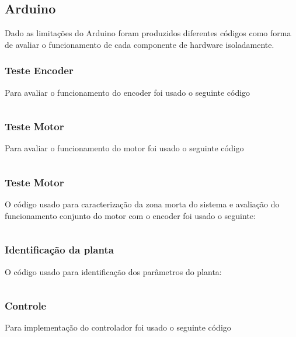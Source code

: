 \documentclass[a4paper,11pt]{article}
\begin{document}
\inputminted[xleftmargin=15pt,linenos,frame=single,framesep=5pt,breaklines=true]{matlab}{../matlab/project.m}

\newpage
\subsection*{Arduino}
Dado as limitações do Arduino foram produzidos diferentes códigos como forma de avaliar o funcionamento de cada componente de hardware isoladamente.

\subsubsection*{Teste Encoder}
Para avaliar o funcionamento do encoder foi usado o seguinte código
\inputminted[xleftmargin=15pt,linenos,frame=single,framesep=5pt,breaklines=true]{c++}{../arduino/test_enconder/test_enconder.ino}

\newpage
\subsubsection*{Teste Motor}
Para avaliar o funcionamento do motor foi usado o seguinte código
\inputminted[xleftmargin=15pt,linenos,frame=single,framesep=5pt,breaklines=true]{c++}{../arduino/test_dcmotor/test_dcmotor.ino}

\newpage
\subsubsection*{Teste Motor}
O código usado para caracterização da zona morta do sistema e avaliação do funcionamento conjunto do motor com o encoder foi usado o seguinte:
\inputminted[xleftmargin=15pt,linenos,frame=single,framesep=5pt,breaklines=true]{c++}{../arduino/test_dcmotor_characterization/test_dcmotor_characterization.ino}

\newpage
\subsubsection*{Identificação da planta}
O código usado para identificação dos parâmetros do planta:
\inputminted[xleftmargin=15pt,linenos,frame=single,framesep=5pt,breaklines=true]{c++}{../arduino/test_dcmotor_pulses/test_dcmotor_pulses.ino}


\newpage
\subsubsection*{Controle}
Para implementação do controlador foi usado o seguinte código
\inputminted[xleftmargin=15pt,linenos,frame=single,framesep=5pt,breaklines=true]{c++}{../arduino/pid_control/pid_control.ino}

\end{document}
